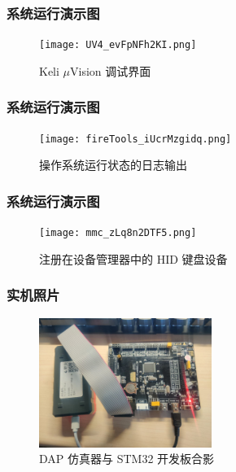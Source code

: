 \documentclass[aspectratio=169]{ctexbeamer}
\begin{document}
\begin{frame}

    \frametitle{系统运行演示图}

    \begin{figure}
        \centering
            \captionsetup{font=song}
            \texttt{[image: UV4\_evFpNFh2KI.png]}
            \caption{Keli \(\mu\)Vision 调试界面}
    \end{figure}

\end{frame}

\begin{frame}

    \frametitle{系统运行演示图}

    \begin{figure}
        \centering
            \captionsetup{font=song}
            \texttt{[image: fireTools\_iUcrMzgidq.png]}
            \caption{操作系统运行状态的日志输出}
    \end{figure}

\end{frame}

\begin{frame}

    \frametitle{系统运行演示图}

    \begin{figure}
        \centering
            \captionsetup{font=song}
            \texttt{[image: mmc\_zLq8n2DTF5.png]}
            \caption{注册在设备管理器中的 HID 键盘设备}
    \end{figure}

\end{frame}

\begin{frame}

    \frametitle{实机照片}

    \begin{figure}
        \centering
            \captionsetup{font=song}
            \includegraphics[width=0.5\textwidth, keepaspectratio]{6278327080001319126_121.jpg}
            \caption{DAP 仿真器与 STM32 开发板合影}
    \end{figure}

\end{frame}
\end{document}
